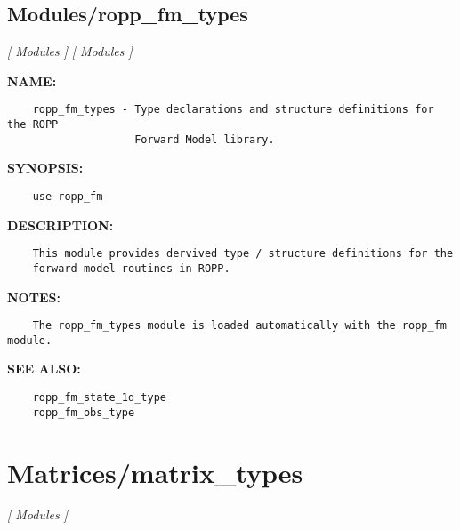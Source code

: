 \subsection{Modules/ropp\_fm\_types}
\textsl{[ Modules ]}
\textsl{[ Modules ]}

\label{ch:robo69}
\label{ch:Modules_ropp_fm_types}
\textbf{NAME:}\hspace{0.08in}\begin{Verbatim}
    ropp_fm_types - Type declarations and structure definitions for the ROPP
                    Forward Model library.
\end{Verbatim}
\textbf{SYNOPSIS:}\hspace{0.08in}\begin{Verbatim}
    use ropp_fm
\end{Verbatim}
\textbf{DESCRIPTION:}\hspace{0.08in}\begin{Verbatim}
    This module provides dervived type / structure definitions for the
    forward model routines in ROPP.
\end{Verbatim}
\textbf{NOTES:}\hspace{0.08in}\begin{Verbatim}
    The ropp_fm_types module is loaded automatically with the ropp_fm module.
\end{Verbatim}
\textbf{SEE ALSO:}\hspace{0.08in}\begin{Verbatim}
    ropp_fm_state_1d_type
    ropp_fm_obs_type
\end{Verbatim}
\section{Matrices/matrix\_types}
\textsl{[ Modules ]}

